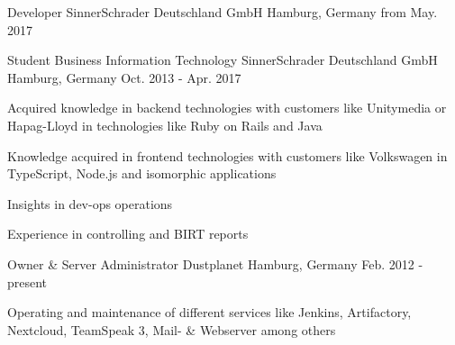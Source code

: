 

\begin{cventries}

  \cventry
    {Developer} %
    {SinnerSchrader Deutschland GmbH} %
    {Hamburg, Germany} %
    {from May. 2017} %
    {
    }

  \cventry
    {Student Business Information Technology} %
    {SinnerSchrader Deutschland GmbH} %
    {Hamburg, Germany} %
    {Oct. 2013 - Apr. 2017} %
    {
      \begin{cvitems} %
        \item {Acquired knowledge in backend technologies with customers like Unitymedia or Hapag-Lloyd in technologies like Ruby on Rails and Java}
        \item {Knowledge acquired in frontend technologies with customers like Volkswagen in TypeScript, Node.js and isomorphic applications}
        \item {Insights in dev-ops operations}
        \item {Experience in controlling and BIRT reports}
      \end{cvitems}
    }

  \cventry
    {Owner \& Server Administrator} %
    {Dustplanet} %
    {Hamburg, Germany} %
    {Feb. 2012 - present} %
    {
      \begin{cvitems} %
      	\item {Operating and maintenance of different services like Jenkins, Artifactory, Nextcloud, TeamSpeak 3, Mail- \& Webserver among others}
      \end{cvitems}
    }

\end{cventries}
